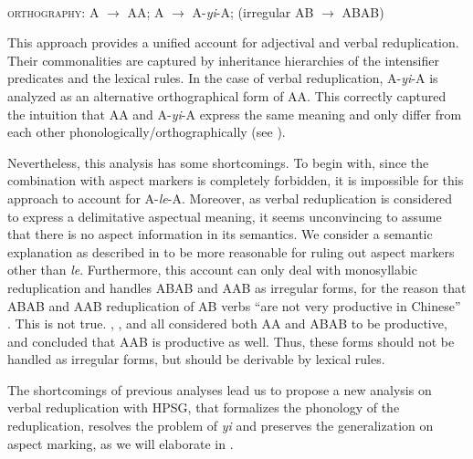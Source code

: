 \ea\label{avm:fsb-redup-v}
\\
\textsc{orthography}: A $\to$ AA; A $\to$ A-\textit{yi}-A; (irregular AB $\to$ ABAB)
\z

This approach provides a unified account for adjectival and verbal reduplication.
Their commonalities are captured by inheritance hierarchies of the intensifier predicates and the lexical rules.
In the case of verbal reduplication, A-\textit{yi}-A is analyzed as an alternative orthographical form of AA.
This correctly captured the intuition that AA and A-\textit{yi}-A express the same meaning and only differ from each other phonologically/orthographically (see ).

Nevertheless, this analysis has some shortcomings.
To begin with, since the combination with aspect markers is completely forbidden, it is impossible for this approach to account for A\hyp{}\textit{le}\hyp{}A.
Moreover, as verbal reduplication is  considered to express a delimitative aspectual meaning,
it seems unconvincing to assume that there is no aspect information in its semantics.
We consider a semantic explanation as described in   to be more reasonable for ruling out aspect markers other than \textit{le}.
Furthermore, this account can only deal with monosyllabic reduplication and handles ABAB and AAB as irregular forms, for the reason that ABAB and AAB reduplication of AB verbs ``are not very productive in Chinese'' \citep[102]{FanSongBond2015}.
This is not true. 
\citet[33]{Xing2000stat}, \citet[161]{BascianoMelloni2017}, \citet[329]{MelloniBasciano2018} and  \citet[Sec. 3.1]{Xie2020}  all considered both AA and ABAB to be productive,
and \citet[36]{Xing2000stat} concluded that AAB is productive as well.
Thus, these forms should not be handled as  irregular forms, but should be derivable by lexical rules.


 
 


The shortcomings of previous analyses lead us to propose a new analysis on verbal reduplication with {HPSG}, 
that formalizes the phonology of the reduplication, resolves the problem of \textit{yi} and preserves the generalization on aspect marking, 
as we will elaborate in . 

